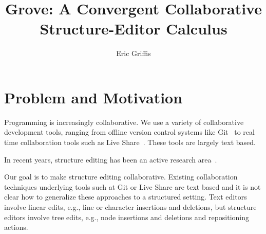 \documentclass[nonacm, acmsmall, screen, review]{acmart}
\begin{document}
\title[Grove]{Grove: A Convergent Collaborative Structure-Editor Calculus}


\author{Eric Griffis}


\maketitle


\section{Problem and Motivation}


Programming is increasingly collaborative.
We use a variety of collaborative development tools, ranging from offline version control systems like Git~\cite{?} to real time collaboration tools such as Live Share~\cite{?}.
These tools are largely text based.

In recent years, structure editing has been an active research area~\cite{scratch, MPS, hazel, and something like WebFlow that invokes this category of end user dev tools}.

%

Our goal is to make structure editing collaborative.
Existing collaboration techniques underlying tools such at Git or Live Share are text based and it is not clear how to generalize these approaches to a structured setting.
Text editors involve linear edits, e.g., line or character insertions and deletions, but structure editors involve tree edits, e.g., node insertions and deletions and repositioning actions.
\end{document}
